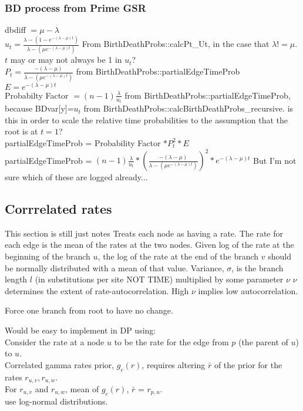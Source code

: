 \documentclass{llncs}
\newcommand{\ejmcomment}[1]{{\color{green} #1}}
\begin{document}
\subsubsection{BD process from Prime GSR\\}

dbdiff $= \mu - \lambda$\\
$u_t =\frac{\lambda-(1-e^{-(\lambda-\mu)t})}{\lambda-(\mu e^{-(\lambda - \mu)t})}$ From BirthDeathProbs::calcPt\_Ut, in the case that $\lambda != \mu$. \ejmcomment{$t$ may or may not always be 1 in $u_t$?}\\
$P_t = \frac{-(\lambda-\mu)}{\lambda-(\mu e^{-(\lambda - \mu)t})}$ from BirthDeathProbs::partialEdgeTimeProb\\
$E=e^{-(\lambda-\mu)t}$\\
Probabilty Factor $= (n-1)\frac{\lambda}{u_t}$ from BirthDeathProbs::partialEdgeTimeProb, because BDvar[y]=$u_t$ from BirthDeathProbs::calcBirthDeathProbs\_recursive. 
\ejmcomment{is this in order to scale the relative time probabilities to the assumption that the root is at $t=1$?}\\
partialEdgeTimeProb = Probability Factor $*P_t^2 *E$\\
partialEdgeTimeProb = $(n-1)\frac{\lambda}{u_t} * ( \frac{-(\lambda-\mu)}{\lambda-(\mu e^{-(\lambda - \mu)t})})^2 * e^{-(\lambda-\mu)t}$\ejmcomment{But I'm not sure which of these are logged already...}\\

\subsection{Corrrelated rates \cite{Kishino2001}}\ejmcomment{This section is still just notes}
Treats each node as having a rate.
The rate for each edge is the mean of the rates at the two nodes.
Given log  of the rate at the beginning of the branch $u$, the log of the rate at the end of the branch $v$ should be normally distributed with a mean of that value.
Variance, $\sigma$, is the branch length $l$ (in substitutions per site NOT TIME) multiplied by some parameter $\nu$
$\nu$ determines the extent of rate-autocorrelation. High $\nu$ implies low autocorrelation. 

Force one branch from root to have no change.


Would be easy to implement in DP using:\\
Consider the rate at a node $u$ to be the rate for the edge from $p$ (the parent of $u$) to $u$.\\
Correlated gamma rates prior, $g_c(r)$, requires altering $\bar{r}$ of the prior for the rates $r_{u,v}, r_{u,w}$.\\
For $r_{u,v}$ and $r_{u,w}$, mean of $g_c(r)$, $\bar{r}$ = $r_{p,u}$.\\
\cite{Kishino2001} use log-normal distributions.\\





\end{document}
